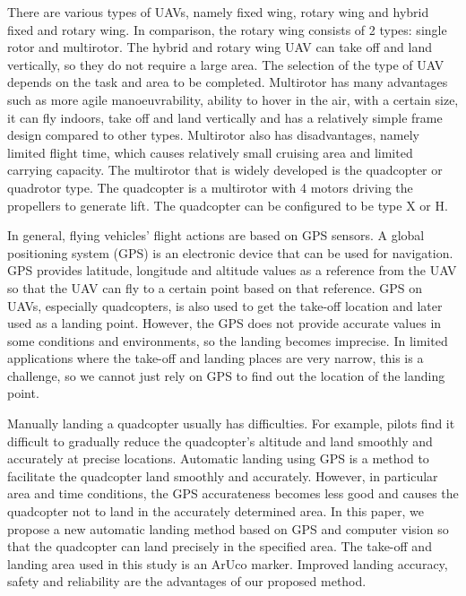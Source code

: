 \documentclass[a4paper]{jpconf}
\begin{document}
There are various types of UAVs, namely fixed wing, rotary wing and hybrid fixed and rotary wing. In comparison, the rotary wing consists of 2 types: single rotor and multirotor. The hybrid and rotary wing UAV can take off and land vertically, so they do not require a large area. The selection of the type of UAV depends on the task and area to be completed. Multirotor has many advantages such as more agile manoeuvrability, ability to hover in the air, with a certain size, it can fly indoors, take off and land vertically and has a relatively simple frame design compared to other types\cite{ref4}. Multirotor also has disadvantages, namely limited flight time, which causes relatively small cruising area and limited carrying capacity. The multirotor that is widely developed is the quadcopter or quadrotor type. The quadcopter is a multirotor with 4 motors driving the propellers to generate lift. The quadcopter can be configured to be type X or H.

In general, flying vehicles' flight actions are based on GPS sensors\cite{ref5}. A global positioning system (GPS) is an electronic device that can be used for navigation\cite{ref6}. GPS provides latitude, longitude and altitude values as a reference from the UAV so that the UAV can fly to a certain point based on that reference. GPS on UAVs, especially quadcopters, is also used to get the take-off location and later used as a landing point. However, the GPS does not provide accurate values in some conditions and environments, so the landing becomes imprecise. In limited applications where the take-off and landing places are very narrow, this is a challenge, so we cannot just rely on GPS to find out the location of the landing point\cite{ref7}.

Manually landing a quadcopter usually has difficulties. For example, pilots find it difficult to gradually reduce the quadcopter's altitude and land smoothly and accurately at precise locations. Automatic landing using GPS is a method to facilitate the quadcopter land smoothly and accurately. However, in particular area and time conditions, the GPS accurateness becomes less good and causes the quadcopter not to land in the accurately determined area\cite{ref8}. In this paper, we propose a new automatic landing method based on GPS and computer vision so that the quadcopter can land precisely in the specified area. The take-off and landing area used in this study is an ArUco marker. Improved landing accuracy, safety and reliability are the advantages of our proposed method.
\end{document}
